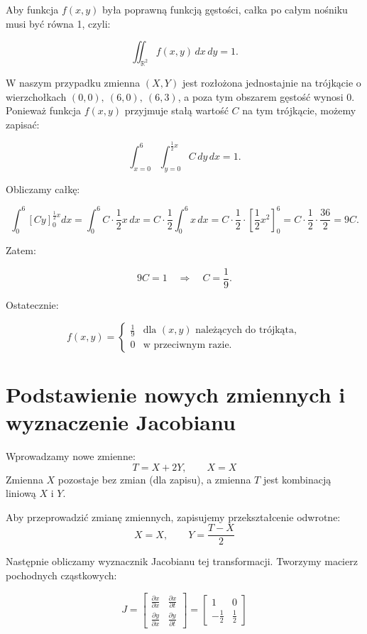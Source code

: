 \documentclass{article}
\begin{document}
Aby funkcja \( f(x, y) \) była poprawną funkcją gęstości, całka po całym nośniku musi być równa 1, czyli:

\[
\iint_{\mathbb{R}^2} f(x, y) \, dx \, dy = 1.
\]

W naszym przypadku zmienna \( (X, Y) \) jest rozłożona jednostajnie na trójkącie o wierzchołkach \( (0, 0),\ (6, 0),\ (6, 3) \), a poza tym obszarem gęstość wynosi 0. Ponieważ funkcja \( f(x, y) \) przyjmuje stałą wartość \( C \) na tym trójkącie, możemy zapisać:

\[
\int_{x=0}^{6} \int_{y=0}^{\frac{1}{2}x} C \, dy \, dx = 1.
\]

Obliczamy całkę:

\[
\int_{0}^{6} \left[ C y \right]_0^{\frac{1}{2}x} dx = \int_{0}^{6} C \cdot \frac{1}{2}x \, dx = C \cdot \frac{1}{2} \int_{0}^{6} x \, dx = C \cdot \frac{1}{2} \cdot \left[ \frac{1}{2}x^2 \right]_0^6 = C \cdot \frac{1}{2} \cdot \frac{36}{2} = 9C.
\]

Zatem:

\[
9C = 1 \quad \Rightarrow \quad C = \frac{1}{9}.
\]

Ostatecznie:

\[
f(x, y) =
\begin{cases}
\frac{1}{9} & \text{dla } (x, y) \text{ należących do trójkąta}, \\
0 & \text{w przeciwnym razie}.
\end{cases}
\]

\section{Podstawienie nowych zmiennych i wyznaczenie Jacobianu}

Wprowadzamy nowe zmienne:
\[
T = X + 2Y, \qquad X = X
\]
Zmienna \( X \) pozostaje bez zmian (dla zapisu), a zmienna \( T \) jest kombinacją liniową \( X \) i \( Y \).

Aby przeprowadzić zmianę zmiennych, zapisujemy przekształcenie odwrotne:
\[
X = X, \qquad Y = \frac{T - X}{2}
\]

Następnie obliczamy wyznacznik Jacobianu tej transformacji. Tworzymy macierz pochodnych cząstkowych:

\[
J =
\begin{bmatrix}
\frac{\partial x}{\partial x} & \frac{\partial x}{\partial t} \\
\frac{\partial y}{\partial x} & \frac{\partial y}{\partial t}
\end{bmatrix}
=
\begin{bmatrix}
1 & 0 \\
-\frac{1}{2} & \frac{1}{2}
\end{bmatrix}
\]
\end{document}
